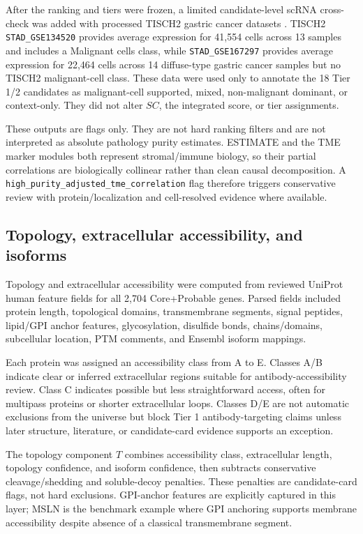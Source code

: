\documentclass[twocolumn]{article}
\begin{document}
After the ranking and tiers were frozen, a limited candidate-level scRNA cross-check was added with processed TISCH2 gastric cancer datasets \cite{han2023tisch2,zhang2019gastric_scrna,jeong2021gastric_tme}. TISCH2 \texttt{STAD\_GSE134520} provides average expression for 41,554 cells across 13 samples and includes a Malignant cells class, while \texttt{STAD\_GSE167297} provides average expression for 22,464 cells across 14 diffuse-type gastric cancer samples but no TISCH2 malignant-cell class. These data were used only to annotate the 18 Tier 1/\allowbreak{}2 candidates as malignant-cell supported, mixed, non-malignant dominant, or context-only. They did not alter $SC$, the integrated score, or tier assignments.

These outputs are flags only. They are not hard ranking filters and are not interpreted as absolute pathology purity estimates. ESTIMATE and the TME marker modules both represent stromal/\allowbreak{}immune biology, so their partial correlations are biologically collinear rather than clean causal decomposition. A \texttt{high\_purity\_adjusted\_tme\_correlation} flag therefore triggers conservative review with protein/\allowbreak{}localization and cell-resolved evidence where available.

\subsection{Topology, extracellular accessibility, and isoforms}

Topology and extracellular accessibility were computed from reviewed UniProt human feature fields for all 2,704 Core+\allowbreak{}Probable genes. Parsed fields included protein length, topological domains, transmembrane segments, signal peptides, lipid/\allowbreak{}GPI anchor features, glycosylation, disulfide bonds, chains/\allowbreak{}domains, subcellular location, PTM comments, and Ensembl isoform mappings.

Each protein was assigned an accessibility class from A to E. Classes A/\allowbreak{}B indicate clear or inferred extracellular regions suitable for antibody-accessibility review. Class C indicates possible but less straightforward access, often for multipass proteins or shorter extracellular loops. Classes D/\allowbreak{}E are not automatic exclusions from the universe but block Tier 1 antibody-targeting claims unless later structure, literature, or candidate-card evidence supports an exception.

The topology component $T$ combines accessibility class, extracellular length, topology confidence, and isoform confidence, then subtracts conservative cleavage/\allowbreak{}shedding and soluble-decoy penalties. These penalties are candidate-card flags, not hard exclusions. GPI-anchor features are explicitly captured in this layer; MSLN is the benchmark example where GPI anchoring supports membrane accessibility despite absence of a classical transmembrane segment.
\end{document}
